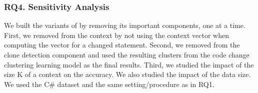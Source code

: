 





\subsubsection{RQ4. Sensitivity Analysis}

We built the variants of {\tool} by removing its important components,
one at a time. First, we removed from {\tool} the context by not using
the context vector when computing the vector for a changed
statement. Second, we removed from {\tool} the clone detection
component and used the resulting clusters from the code change
clustering learning model as the final results. Third, we studied the
impact of the size K of a context on the accuracy. We also studied the
impact of the data size. We used the C\# dataset and the same
setting/procedure as in RQ1.


